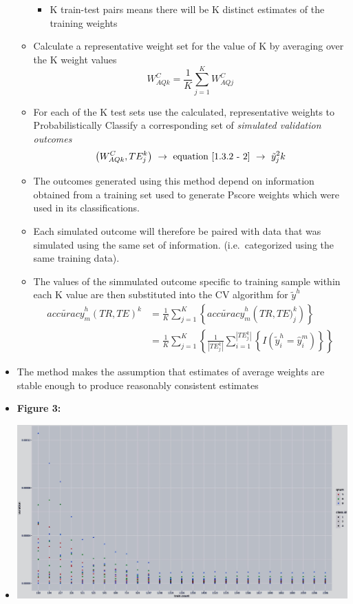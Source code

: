 \documentclass[12pt,]{article}
\providecommand{\tightlist}{%
  \setlength{\itemsep}{0pt}\setlength{\parskip}{0pt}}
\begin{document}
\begin{itemize}
\begin{itemize}
    \begin{itemize}
    \tightlist
    \item
      K train-test pairs means there will be K distinct estimates of the
      training weights
    \end{itemize}
  \item
    Calculate a representative weight set for the value of K by
    averaging over the K weight values
    \[W_{AQk}^{C}=\frac{1}{K}\sum_{j=1}^{K} W_{AQj}^{C}\]
  \item
    For each of the K test sets use the calculated, representative
    weights to Probabilistically Classify a corresponding set of
    \textit{simulated validation outcomes}
    \[\left(W_{AQk}^{C}, TE_{j}^{k}\right)  \ \rightarrow \ \text{equation} \ \eqref{1.3.2 - 2} \ \rightarrow \   \tilde{y}_{j}^2{k}\]
  \item
    The outcomes generated using this method depend on information
    obtained from a training set used to generate Pscore weights which
    were used in its classifications.\\
  \item
    Each simulated outcome will therefore be paired with data that was
    simulated using the same set of information. (i.e.~categorized using
    the same training data).
  \item
    The values of the simmulated outcome specific to training sample
    within each K value are then substituted into the CV algorithm for
    \(\tilde{y}^{h}\) \begin{eqnarray*}
      \tilde{accuracy}_{m}^{h}\left(TR, TE \right)^{k} &= \frac{1}{K}\sum_{j=1}^{K} \left \{\tilde{accuracy}_{m}^{h} \left(TR, TE)_{j}^{k}   \right)   \right \} \\
      &= \frac{1}{K}\sum_{j=1}^{K} \left \{ \frac{1}{|TE_{j}^{k}|} \sum_{i=1}^{|TE_{j}^{k}|} \left \{ I\left(\tilde{y}_{i}^{h}=\hat{y}_{i}^{m} \right) \right \}   \right \}
    \end{eqnarray*}
  \end{itemize}
\item
  The method makes the assumption that estimates of average weights are
  stable enough to produce reasonably consistent estimates
\item
  \textbf{Figure 3:}
\item
  \includegraphics{variance plot.jpeg}

\end{itemize}
\end{document}
